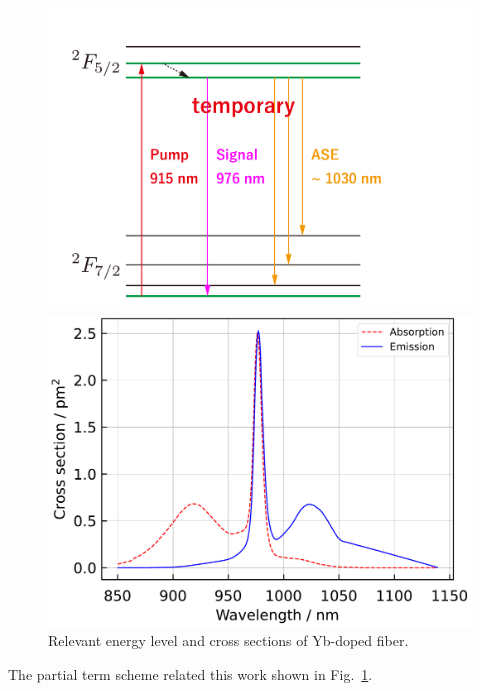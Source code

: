\documentclass{osa-article}
\begin{document}
\begin{figure}[h!]
  \begin{minipage}[b]{0.5\linewidth}
    \centering
    \includegraphics[keepaspectratio, width=0.9\linewidth]{./Figure/RelevantEnergyLevelOfYb3+InAluminosilicate}
  \end{minipage}
  \begin{minipage}[b]{0.5\linewidth}
    \centering
    \includegraphics[keepaspectratio, width=0.9\linewidth]{./Figure/CrossSectionOfYb3+InAluminosilicate}
  \end{minipage}
  \caption{Relevant energy level and cross sections of Yb-doped fiber.}
  \label{fig:EnergylevelAndCrosssectionOfYb3+}
\end{figure}
The partial term scheme related this work shown in Fig.~\ref{fig:EnergylevelAndCrosssectionOfYb3+}.
\end{document}

